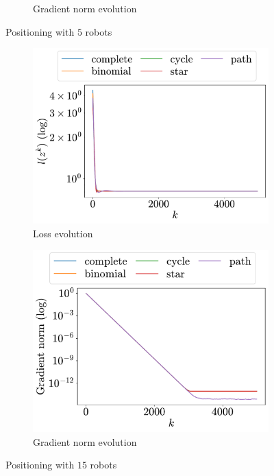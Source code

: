 \documentclass[a4paper,11pt,oneside]{book}
\begin{document}
\begin{figure}[H]
\begin{subfigure}[t]{0.48\linewidth}
            \caption{Gradient norm evolution}
      \end{subfigure}
      \caption{Positioning with $5$ robots}
      \label{fig:positioning_5}
\end{figure}

\begin{figure}[H]
      \centering
      \begin{subfigure}[t]{0.48\linewidth}
            \centering
            \includegraphics[width=\linewidth]{./figs/aggregative/more_agents/loss.pdf} 
            \caption{Loss evolution}
      \end{subfigure}
      \hfill
      \begin{subfigure}[t]{0.48\linewidth}
            \centering
            \includegraphics[width=\linewidth]{./figs/aggregative/more_agents/gradient.pdf} 
            \caption{Gradient norm evolution}
      \end{subfigure}
      \caption{Positioning with $15$ robots}
      \label{fig:positioning_15}
\end{figure}
\end{document}

